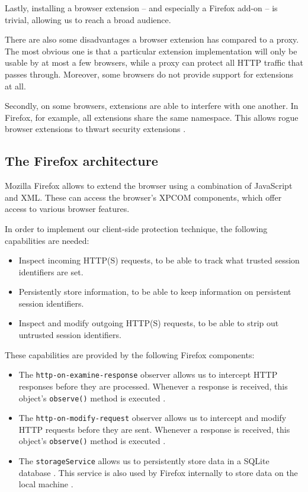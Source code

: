 Lastly, installing a browser extension -- and especially a Firefox add-on -- is trivial, allowing us to reach a broad audience.

There are also some disadvantages a browser extension has compared to a proxy. The most obvious one is that a particular extension implementation will only be usable by at most a few browsers, while a proxy can protect all HTTP traffic that passes through. Moreover, some browsers do not provide support for extensions at all.

Secondly, on some browsers, extensions are able to interfere with one another. In Firefox, for example, all extensions share the same namespace. This allows rogue browser extensions to thwart security extensions \cite{Barth2010,TerLouw2007}.

\subsection{The Firefox architecture}

Mozilla Firefox allows to extend the browser using a combination of JavaScript and XML. These can access the browser's XPCOM components, which offer access to various browser features.

In order to implement our client-side protection technique, the following capabilities are needed:
\begin{itemize}
	\item Inspect incoming HTTP(S) requests, to be able to track what trusted session identifiers are set.
	\item Persistently store information, to be able to keep information on persistent session identifiers.
	\item Inspect and modify outgoing HTTP(S) requests, to be able to strip out untrusted session identifiers.
\end{itemize}
These capabilities are provided by the following Firefox components:
\begin{itemize}
	\item The \texttt{http-on-examine-response} observer allows us to intercept HTTP responses before they are processed. Whenever a response is received, this object's \texttt{observe()} method is executed \cite{MozillaObservers}.
	\item The \texttt{http-on-modify-request} observer allows us to intercept and modify HTTP requests before they are sent. Whenever a response is received, this object's \texttt{observe()} method is executed \cite{MozillaObservers}.
	\item The \texttt{storageService} allows us to persistently store data in a SQLite database \cite{MozillaStorage}. This service is also used by Firefox internally to store data on the local machine \cite{Bonne2011}.
\end{itemize}

